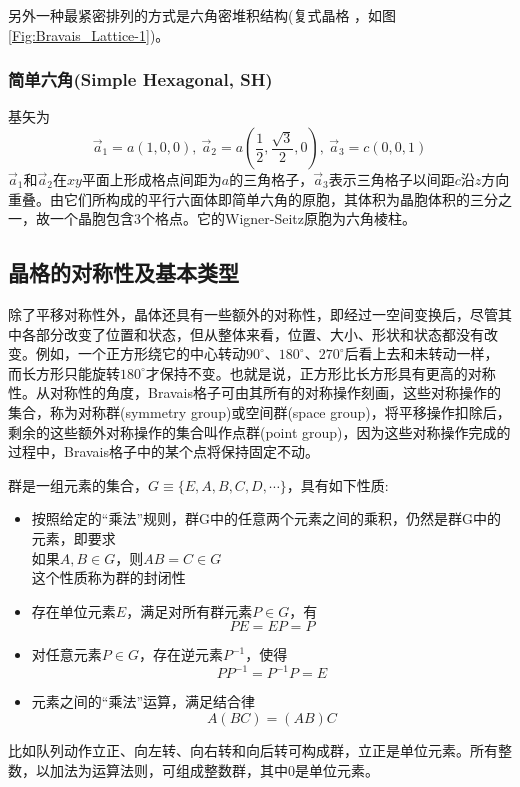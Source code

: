 另外一种最紧密排列的方式是六角密堆积结构(复式晶格 ，如图\ref{Fig:Bravais_Lattice-1})。

\subsubsection{简单六角(Simple Hexagonal, SH)}
基矢为
\begin{displaymath}
	\vec a_1=a(1,0,0),~\vec a_2=a(\frac12,\frac{\sqrt3}2,0),~\vec a_3=c(0,0,1)
\end{displaymath} 
$\vec a_1$和$\vec a_2$在$xy$平面上形成格点间距为$a$的三角格子，$\vec a_3$表示三角格子以间距$c$沿$z$方向重叠。由它们所构成的平行六面体即简单六角的原胞，其体积为晶胞体积的三分之一，故一个晶胞包含3个格点。它的Wigner-Seitz原胞为六角棱柱。

\subsection{晶格的对称性及基本类型} 
除了平移对称性外，晶体还具有一些额外的对称性，即经过一空间变换后，尽管其中各部分改变了位置和状态，但从整体来看，位置、大小、形状和状态都没有改变。例如，一个正方形绕它的中心转动$90^{\circ}$、$180^{\circ}$、$270^{\circ}$后看上去和未转动一样，而长方形只能旋转$180^{\circ}$才保持不变。也就是说，正方形比长方形具有更高的对称性。从对称性的角度，Bravais格子可由其所有的对称操作刻画，这些对称操作的集合，称为对称群(symmetry group)或空间群(space group)，将平移操作扣除后，剩余的这些额外对称操作的集合叫作点群(point group)，因为这些对称操作完成的过程中，Bravais格子中的某个点将保持固定不动。

群是一组元素的集合，$G\equiv\{E,A,B,C,D,\cdots\}$，具有如下性质:
\begin{itemize}
	\item 按照给定的``乘法''规则，群G中的任意两个元素之间的乘积，仍然是群G中的元素，即要求\\如果$A,B\in G$，则$AB=C\in G$\\
		这个性质称为群的封闭性
	\item 存在单位元素$E$，满足对所有群元素$P\in G$，有
		\begin{displaymath}
			PE=EP=P
		\end{displaymath}
	\item 对任意元素$P\in G$，存在逆元素$P^{-1}$，使得
		\begin{displaymath}
			PP^{-1}=P^{-1}P=E
		\end{displaymath}
	\item 元素之间的``乘法''运算，满足结合律
		\begin{displaymath}
			A(BC)=(AB)C
		\end{displaymath}
\end{itemize}
比如队列动作立正、向左转、向右转和向后转可构成群，立正是单位元素。所有整数，以加法为运算法则，可组成整数群，其中0是单位元素。

